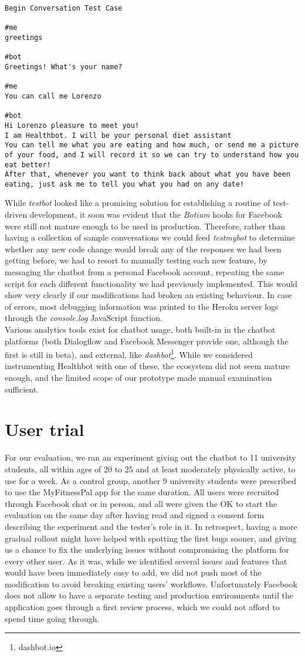 \begin{lstlisting}
Begin Conversation Test Case

#me
greetings

#bot
Greetings! What's your name?

#me
You can call me Lorenzo

#bot
Hi Lorenzo pleasure to meet you!
I am Healthbot. I will be your personal diet assistant
You can tell me what you are eating and how much, or send me a picture of your food, and I will record it so we can try to understand how you eat better!
After that, whenever you want to think back about what you have been eating, just ask me to tell you what you had on any date!
\end{lstlisting}
While \textit{testbot} looked like a promising solution for establishing a routine of test-driven development, it soon was evident that the \textit{Botium} hooks for Facebook were still not mature enough to be used in production. Therefore, rather than having a collection of sample conversations we could feed \textit{testmybot} to determine whether any new code change would break any of the responses we had been getting before, we had to resort to manually testing each new feature, by messaging the chatbot from a personal Facebook account, repeating the same script for each different functionality we had previously implemented. This would show very clearly if our modifications had broken an existing behaviour. In case of errors, most debugging information was printed to the Heroku server logs through the \textit{console.log} JavaScript function. \\
Various analytics tools exist for chatbot usage, both built-in in the chatbot platforms (both Dialogflow and Facebook Messenger provide one, although the first is still in beta), and external, like \textit{dashbot}\footnote{dashbot.io}. While we considered instrumenting Healthbot with one of these, the ecosystem did not seem mature enough, and the limited scope of our prototype made manual examination sufficient.
\section{User trial}
For our evaluation, we ran an experiment giving out the chatbot to 11 university students, all within ages of 20 to 25 and at least moderately physically active, to use for a week. As a control group, another 9 university students were prescribed to use the MyFitnessPal app for the same duration. All users were recruited through Facebook chat or in person, and all were given the OK to start the evaluation on the same day after having read and signed a consent form describing the experiment and the tester's role in it. In retrospect, having a more gradual rollout might have helped with spotting the first bugs sooner, and giving us a chance to fix the underlying issues without compromising the platform for every other user. As it was, while we identified several issues and features that would have been immediately easy to add, we did not push most of the modification to avoid breaking existing users' workflows. Unfortunately Facebook does not allow to have a separate testing and production environments until the application goes through a first review process, which we could not afford to spend time going through.

